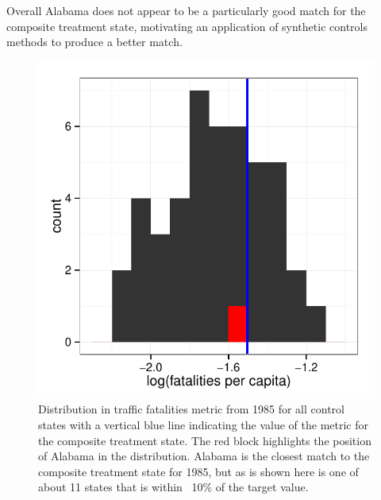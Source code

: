 \documentclass[letterpaper, 12pt]{article}
\begin{document}
Overall Alabama does not appear to be a particularly good match for the composite treatment state, motivating an application of synthetic controls methods to produce a better match.  

\begin{figure}[htbp]
\begin{center}
\includegraphics{img-p2b-compareStates.pdf}
\caption{Distribution in traffic fatalities metric from 1985 for all control states with a vertical blue line indicating the value of the metric for the composite treatment state.  The red block highlights the position of Alabama in the distribution.  Alabama is the closest match to the composite treatment state for 1985, but as is shown here is one of about 11 states that is within ~10\% of the target value.}
\label{fig:a21}
\end{center}
\end{figure}



\end{document}
